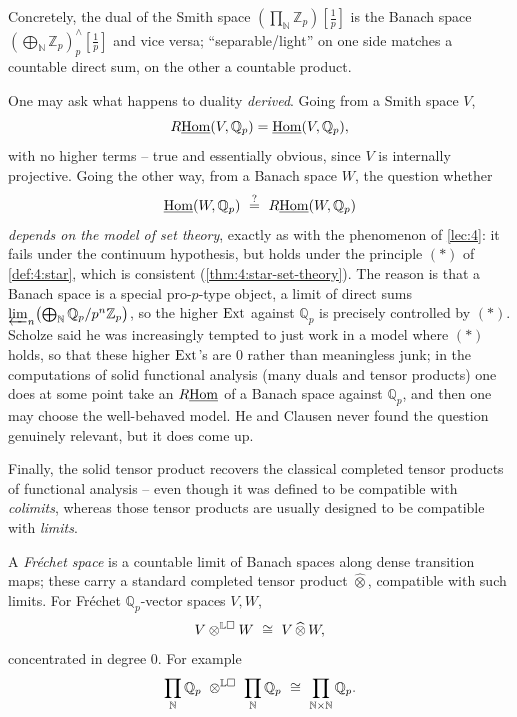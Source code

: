 Concretely, the dual of the Smith space $(\prod_{\mathbb{N}}\mathbb{Z}_p)[\tfrac1p]$
is the Banach space $(\bigoplus_{\mathbb{N}}\mathbb{Z}_p)^{\wedge}_p[\tfrac1p]$
and vice versa; ``separable/light'' on one side matches a countable direct sum,
on the other a countable product.

\begin{remark}
\label{rmk:6:derived-duality}
One may ask what happens to duality \emph{derived}. Going from a Smith space $V$,
\begin{equation*}
R\underline{\operatorname{Hom}}(V,\mathbb{Q}_p)=\underline{\operatorname{Hom}}(V,\mathbb{Q}_p),
\end{equation*}
with no higher terms -- true and essentially obvious, since $V$ is internally
projective. Going the other way, from a Banach space $W$, the question whether
\begin{equation*}
\iHom(W,\mathbb{Q}_p)\ \overset{?}{=}\ R\iHom(W,\mathbb{Q}_p)
\end{equation*}
\emph{depends on the model of set theory}, exactly as with the phenomenon of
\cref{lec:4}: it fails under the continuum hypothesis, but holds under the
principle $(\ast)$ of \cref{def:4:star}, which is consistent
(\cref{thm:4:star-set-theory}). The reason is that a Banach space is a special
pro-$p$-type object, a limit of direct sums
$\varprojlim_n\bigl(\bigoplus_{\mathbb{N}}\mathbb{Q}_p/p^{n}\mathbb{Z}_p\bigr)$, so
the higher $\operatorname{Ext}$ against $\mathbb{Q}_p$ is precisely controlled by $(\ast)$.
Scholze said he was increasingly tempted to just work in a model where $(\ast)$
holds, so that these higher $\operatorname{Ext}$'s are $0$ rather than meaningless junk; in the
computations of solid functional analysis (many duals and tensor products) one
does at some point take an $R\underline{\operatorname{Hom}}$ of a Banach space against $\mathbb{Q}_p$, and
then one may choose the well-behaved model. He and Clausen never found the
question genuinely relevant, but it does come up.
\end{remark}

Finally, the solid tensor product recovers the classical completed tensor
products of functional analysis -- even though it was defined to be compatible
with \emph{colimits}, whereas those tensor products are usually designed to be
compatible with \emph{limits}.

\begin{proposition}
\label{prop:6:frechet}
A \emph{Fréchet space} is a countable limit of Banach spaces along dense
transition maps; these carry a standard completed tensor product
$\widehat{\otimes}$, compatible with such limits. For Fréchet
$\mathbb{Q}_p$-vector spaces $V,W$,
\begin{equation*}
V\otimes^{\mathbb{L}\solid}W\ \cong\ V\,\widehat{\otimes}\,W,
\end{equation*}
concentrated in degree $0$. For example
\begin{equation}
\label{eq:6:prod-Qp-tensor}
\prod_{\mathbb{N}}\mathbb{Q}_p\ \otimes^{\mathbb{L}\solid}\ \prod_{\mathbb{N}}\mathbb{Q}_p
\ \cong\ \prod_{\mathbb{N}\times\mathbb{N}}\mathbb{Q}_p .
\end{equation}
\end{proposition}

